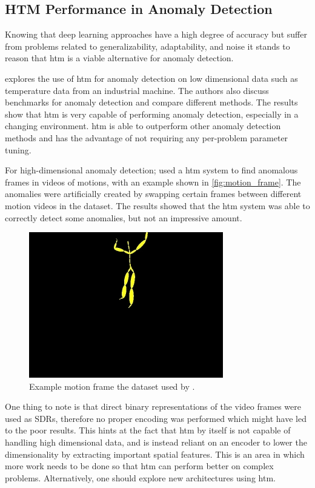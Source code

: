 \subsection{HTM Performance in Anomaly Detection}
\label{sec:htm_perf}
Knowing that deep learning approaches have a high degree of accuracy but suffer from problems related to generalizability, adaptability, and noise it stands to reason that \gls*{htm} is a viable alternative for anomaly detection.\par
\textcite{AHMAD2017134} explores the use of \gls*{htm} for anomaly detection on low dimensional data such as temperature data from an industrial machine. The authors also discuss benchmarks for anomaly detection and compare different methods. The results show that \gls*{htm} is very capable of performing anomaly detection, especially in a changing environment. \gls*{htm} is able to outperform other anomaly detection methods and has the advantage of not requiring any per-problem parameter tuning.
\par
For high-dimensional anomaly detection; \textcite{MotionAnomalyDetection} used a \gls*{htm} system to find anomalous frames in videos of motions, with an example shown in \autoref{fig:motion_frame}. The anomalies were artificially created by swapping certain frames between different motion videos in the dataset. The results showed that the \gls*{htm} system was able to correctly detect some anomalies, but not an impressive amount.
\begin{figure}[htb]
    \centering
    \includegraphics[width=0.5\linewidth]{resources/related_works/motion_frame.png}
    \caption[Example Motion Frame]{Example motion frame the dataset used by \textcite{MotionAnomalyDetection}.}
    \label{fig:motion_frame}
\end{figure}
\par
One thing to note is that direct binary representations of the video frames were used as SDRs, therefore no proper encoding was performed which might have led to the poor results. This hints at the fact that \gls*{htm} by itself is not capable of handling high dimensional data, and is instead reliant on an encoder to lower the dimensionality by extracting important spatial features. This is an area in which more work needs to be done so that \gls*{htm} can perform better on complex problems. Alternatively, one should explore new architectures using \gls*{htm}.
